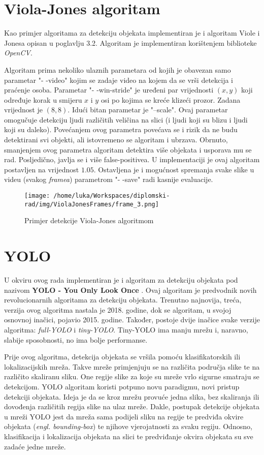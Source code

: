 \section{Viola-Jones algoritam}

Kao primjer algoritama za detekciju objekata implementiran je i algoritam Viole i Jonesa opisan u poglavlju 3.2. Algoritam je implementiran korištenjem biblioteke \textit{OpenCV}.

Algoritam prima nekoliko ulaznih parametara od kojih je obavezan samo parametar "- -video" kojim se zadaje video na kojem da se vrši detekcija i praćenje osoba. Parametar "- -win-stride" je uređeni par vrijednosti $(x, y)$ koji određuje korak u smijeru $x$ i $y$ osi po kojima se kreće klizeći prozor. Zadana vrijednost je $(8, 8)$. Idući bitan parametar je "--scale". Ovaj parametar omogučuje detekciju ljudi različitih veličina na slici (i ljudi koji su blizu i ljudi koji su daleko). Povećanjem ovog parametra povećava se i rizik da ne budu detektirani svi objekti, ali istovremeno se algoritam i ubrzava. Obrnuto, smanjenjem ovog parametra algoritam detektira više objekata i usporava mu se rad. Posljedično, javlja se i više false-positivea. U implementaciji je ovaj algoritam postavljen na vrijednost $1.05$. Ostavljena je i mogućnost spremanja svake slike u videu (svakog \textit{framea}) parametrom "- -save" radi kasnije evaluacije. 

\begin{figure}[htp]
	\centering
	\texttt{[image: /home/luka/Workspaces/diplomski-rad/img/ViolaJonesFrames/frame\_3.png]}
	\caption{Primjer detekcije Viola-Jones algoritmom}
	\label{img:violaJones-detection-example}
\end{figure}

\section{YOLO}

U okviru ovog rada implementiran je i algoritam za detekciju objekata pod nazivom \textbf{YOLO - You Only Look Once} \citep{YOLO}. Ovaj algoritam je predvodnik novih revolucionarnih algoritama za detekciju objekata. Trenutno najnovija, treća, verzija ovog algoritma nastala je 2018. godine, dok se algoritam, u svojoj osnovnoj inačici, pojavio 2015. godine. Također, postoje dvije inačice svake verzije algoritma: \textit{full-YOLO} i \textit{tiny-YOLO}. Tiny-YOLO ima manju mrežu i, naravno, slabije sposobnosti, no ima bolje performanse. 

Prije ovog algoritma, detekcija objekata se vršila pomoću klasifikatorskih ili lokalizacijskih mreža. Takve mreže primjenjuju se na različita područja slike te na različito skaliranu sliku. One regije slike za koje su mreže vrlo sigurne smatraju se detekcijom. YOLO algoritam koristi potpuno novu paradigmu, novi pristup detekciji objekata. Ideja je da se kroz mrežu provuće jedna slika, bez skaliranja ili dovođenja različitih regija slike na ulaz mreže. Dakle, postupak detekcije objekata u mreži YOLO jest da mreža sama podijeli sliku na regije te predviđa okvire objekata (\textit{engl. bounding-box}) te njihove vjerojatnosti za svaku regiju. Odnosno, klasifikacija i lokalizacija objekata na slici te predviđanje okvira objekata su sve zadaće jedne mreže. 

